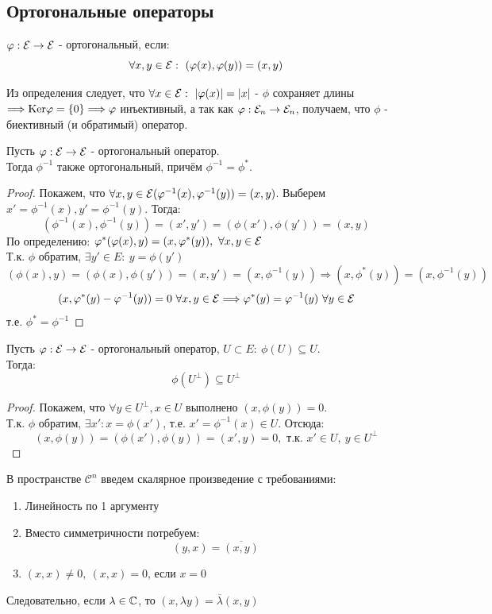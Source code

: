 \subsection{Ортогональные операторы}
\begin{definition}
    $\phi: \E \rightarrow \E$ - ортогональный, если: 
    $$\forall x,y \in \E: \ (\phi(x), \phi(y)) = (x, y)$$ 
\end{definition}
Из определения следует, что $\forall x \in \E: \ |\phi(x)| = |x|$ - $\phi$ сохраняет длины $\Longrightarrow \textup{Ker}\phi = \{0\} \Longrightarrow \phi$ инъективный, а так как $\phi: \E_n \rightarrow \E_n$, получаем, что $\phi$ - биективный (и обратимый) оператор.  
\begin{subtheorem}
    Пусть $\phi: \E \rightarrow \E$ - ортогональный оператор.\\
    Тогда $\phi^{-1}$ также ортогональный, причём $\phi^{-1} = \phi^*$.
\end{subtheorem}
\begin{proof}
    Покажем, что $\forall x,y \in \E (\phi^{-1}(x), \phi^{-1}(y)) = (x, y)$. Выберем $x' = \phi^{-1}(x), y' = \phi^{-1}(y)$. Тогда:
    $$(\phi^{-1}(x), \phi^{-1}(y)) = (x', y') = (\phi(x'), \phi(y')) = (x, y)$$
    По определению: $\phi^* (\phi(x), y) = (x,\phi^*(y)), \ \forall x, y \in \E$\\
    Т.к. $\phi$ обратим, $\exists y' \in E: \ y = \phi(y')$
    $$(\phi(x), y) = (\phi(x), \phi(y')) = (x, y') = (x, \phi^{-1}(y)) \Longrightarrow (x, \phi^*(y)) = (x, \phi^{-1}(y))$$
    $$(x, \phi^*(y) - \phi^{-1}(y)) = 0 \ \forall x,y \in \E \Longrightarrow \phi^*(y) = \phi^{-1}(y) \ \forall y \in \E$$
    т.е. $\phi^* = \phi^{-1}$
\end{proof}
\begin{lemma}
    Пусть $\phi: \E \rightarrow \E$ - ортогональный оператор, $U \subset E: \ \phi(U) \subseteq U$.\\
    Тогда: $$\phi(U^\perp) \subseteq U^\perp$$
\end{lemma}
\begin{proof}
    Покажем, что $\forall y \in U^\perp, x \in U$ выполнено $(x, \phi(y)) = 0$.\\
    Т.к. $\phi$ обратим, $\exists x': x = \phi(x')$, т.е. $x' = \phi^{-1}(x) \in U$. Отсюда:
    $$(x, \phi(y)) = (\phi(x'), \phi(y)) = (x', y) = 0, \text{ т.к. } x' \in U, \ y \in U^\perp$$
\end{proof}
\begin{definition}
    В пространстве $\mathcal{C}^n$ введем скалярное произведение с требованиями:
\begin{enumerate}
    \item Линейность по 1 аргументу
    \item Вместо симметричности потребуем:
    $$(y,x) = \overline{(x,y)}$$
    \item $(x,x) \neq 0, \ (x,x) = 0$, если $x=0$   
\end{enumerate}
Следовательно, если $\lambda \in \CC$, то $(x,\lambda y) = \overline{\lambda}(x,y)$ 
\end{definition}
